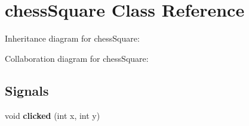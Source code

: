 \hypertarget{classchessSquare}{}\section{chess\+Square Class Reference}
\label{classchessSquare}


Inheritance diagram for chess\+Square\+:


Collaboration diagram for chess\+Square\+:
\subsection*{Signals}
\begin{DoxyCompactItemize}
\item 
\mbox{\label{classchessSquare_a3d79a4695b0bfa8415da18a7c82819c3}} 
void {\bfseries clicked} (int x, int y)
\end{DoxyCompactItemize}
